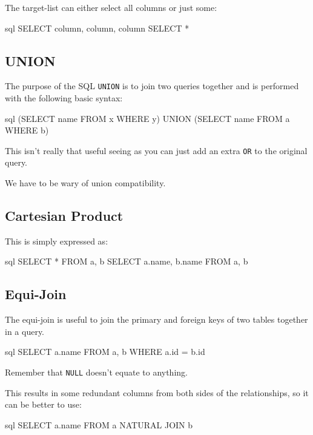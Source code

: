 The target-list can either select all columns or just some:
\begin{code}{sql}
    SELECT column, column, column
    SELECT *
\end{code}

\subsection{UNION}\label{sub:uniondsrseven}

The purpose of the SQL \texttt{UNION} is to join two queries together and is performed with the following basic syntax:
\begin{code}{sql}
    (SELECT name FROM x WHERE y)
    UNION
    (SELECT name FROM a WHERE b)
\end{code}
\begin{note}
    This isn't really that useful seeing as you can just add an extra \texttt{OR} to the original query.
\end{note}
\begin{note}
    We have to be wary of union compatibility.
\end{note}

\subsection{Cartesian Product}\label{sub:caartesianproductdsrseven}

This is simply expressed as:
\begin{code}{sql}
    SELECT * FROM a, b
    SELECT a.name, b.name FROM a, b
\end{code}

\subsection{Equi-Join}\label{sub:equijoindsrseven}

The equi-join is useful to join the primary and foreign keys of two tables together in a query.
\begin{code}{sql}
    SELECT a.name
    FROM a, b
    WHERE a.id = b.id
\end{code}
\begin{note}
    Remember that \texttt{NULL} doesn't equate to anything.
\end{note}
\begin{note}
    This results in some redundant columns from both sides of the relationships, so it can be better to use:
    \begin{code}{sql}
        SELECT a.name
        FROM a
        NATURAL JOIN b
        \end{code}
\end{note}


